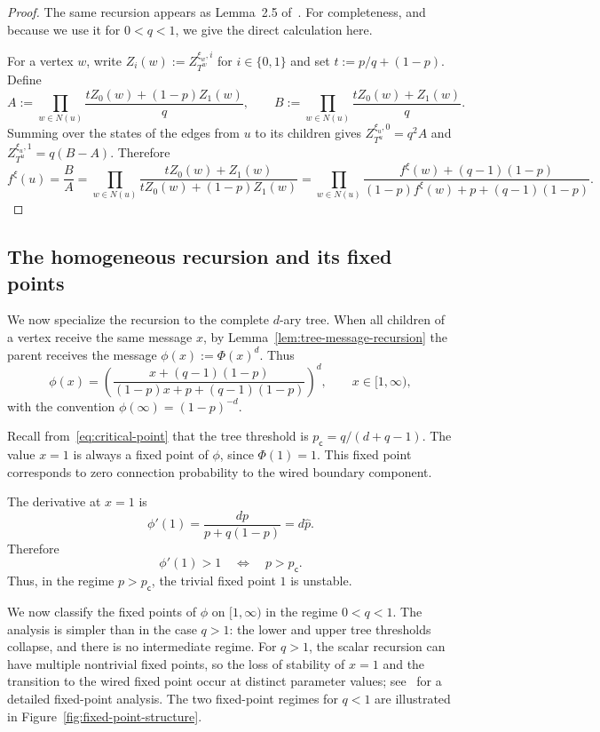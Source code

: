 \documentclass[11pt]{amsart}
\theoremstyle{plain}
\theoremstyle{definition}
\theoremstyle{remark}
\newcommand{\pc}{p_{\mathsf{c}}}
\begin{document}
\begin{proof}
The same recursion appears as Lemma~2.5 of~\cite{blanca2026uniqueness}. For completeness, and because we use it for $0<q<1$, we give the direct calculation here. 

For a vertex $w$, write $Z_i(w):=Z_{T^w}^{\xi_w,i}$ for $i\in\{0,1\}$ and set $t:=p/q+(1-p)$. Define
\[
    A:=\prod_{w\in N(u)}
    \frac{tZ_0(w)+(1-p)Z_1(w)}{q},
    \qquad
    B:=\prod_{w\in N(u)}
    \frac{tZ_0(w)+Z_1(w)}{q}.
\]
Summing over the states of the edges from $u$ to its children gives $Z_{T^u}^{\xi_u,0}=q^2A$ and $Z_{T^u}^{\xi_u,1}=q(B-A)$. Therefore
\[
    f^\xi(u)=\frac BA=\prod_{w\in N(u)}
    \frac{tZ_0(w)+Z_1(w)}
         {tZ_0(w)+(1-p)Z_1(w)}
    =\prod_{w\in N(u)}
    \frac{f^\xi(w)+(q-1)(1-p)}
         {(1-p)f^\xi(w)+p+(q-1)(1-p)}.
\]
\end{proof}

\subsection{The homogeneous recursion and its fixed points}
\label{subsec:fixed-points}

We now specialize the recursion to the complete \(d\)-ary tree. When all children of a vertex receive the same message \(x\), by Lemma~\ref{lem:tree-message-recursion} the parent receives the message $\phi(x):=\Phi(x)^d$. Thus
\begin{equation}
\label{eq:phi}
    \phi(x)
    =
    \left(
    \frac{
        x+(q-1)(1-p)
    }{
        (1-p)x+p+(q-1)(1-p)
    }
    \right)^d,
    \qquad x\in[1,\infty),
\end{equation}
with the convention $\phi(\infty)=(1-p)^{-d}$.

Recall from~\eqref{eq:critical-point} that the tree threshold is
$\pc=q/(d+q-1)$.
The value \(x=1\) is always a fixed point of \(\phi\), since \(\Phi(1)=1\). This fixed point corresponds to zero connection probability to the wired boundary component.

The derivative at \(x=1\) is
\[
    \phi'(1)
    =
    \frac{dp}{p+q(1-p)}
    =
    d\widehat p.
\]
Therefore
\[
    \phi'(1)>1
    \quad\Longleftrightarrow\quad
    p>\pc.
\]
Thus, in the regime \(p>\pc\), the trivial fixed point \(1\) is unstable.

We now classify the fixed points of \(\phi\) on \([1,\infty)\) in the regime \(0<q<1\). The analysis is simpler than in the case \(q>1\): the lower and upper tree thresholds collapse, and there is no intermediate regime. For $q>1$, the scalar recursion can have multiple nontrivial fixed points, so the loss of stability of $x=1$ and the transition to the wired fixed point occur at distinct parameter values; see~\cite{blanca2026uniqueness} for a detailed fixed-point analysis. The two fixed-point regimes for $q<1$ are illustrated in Figure~\ref{fig:fixed-point-structure}.
\end{document}
